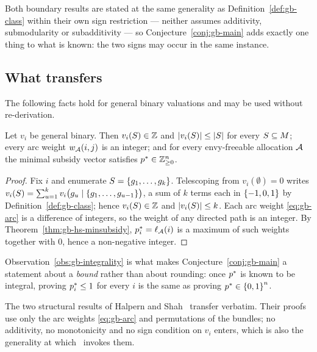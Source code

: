Both boundary results are stated at the same generality as
Definition~\ref{def:gb-class} within their own sign restriction --- neither
assumes additivity, submodularity or subadditivity --- so
Conjecture~\ref{conj:gb-main} adds exactly one thing to what is known: the two
signs may occur in the same instance.

\subsection{What transfers}
\label{sec:gb-transfers}

The following facts hold for general binary valuations and may be used without
re-derivation.

\begin{observation}[Integrality]
\label{obs:gb-integrality}
Let $v_i$ be general binary. Then $v_i(S) \in \mathbb{Z}$ and $\left\lvert v_i(S)\right\rvert \le \left\lvert S\right\rvert$
for every $S \subseteq M$; every arc weight $w_{\mathcal{A}}(i,j)$ is an
integer; and for every envy-freeable allocation $\mathcal{A}$ the minimal subsidy
vector satisfies $p^{*} \in \mathbb{Z}^n_{\ge 0}$.
\end{observation}

\begin{proof}
Fix $i$ and enumerate $S = \left\{g_1,\dots,g_k\right\}$. Telescoping from
$v_i(\emptyset) = 0$ writes
$v_i(S) = \sum_{u=1}^{k} v_i\bigl(g_u \mid \left\{g_1,\dots,g_{u-1}\right\}\bigr)$, a
sum of $k$ terms each in $\left\{-1,0,1\right\}$ by Definition~\ref{def:gb-class};
hence $v_i(S) \in \mathbb{Z}$ and $\left\lvert v_i(S)\right\rvert \le k$. Each arc weight
\eqref{eq:gb-arc} is a difference of integers, so the weight of any directed
path is an integer. By Theorem~\ref{thm:gb-hs-minsubsidy},
$p^{*}_i = \ell_{\mathcal{A}}(i)$ is a maximum of such weights together with
$0$, hence a non-negative integer.
\end{proof}

Observation~\ref{obs:gb-integrality} is what makes
Conjecture~\ref{conj:gb-main} a statement about a \emph{bound} rather than
about rounding: once $p^{*}$ is known to be integral, proving
$p^{*}_i \le 1$ for every $i$ is the same as proving
$p^{*} \in \left\{0,1\right\}^n$.

The two structural results of Halpern and Shah~\cite{HS19} transfer verbatim.
Their proofs use only the arc weights \eqref{eq:gb-arc} and permutations of the
bundles; no additivity, no monotonicity and no sign condition on $v_i$ enters,
which is also the generality at which~\cite{BKNS22} invokes them.


